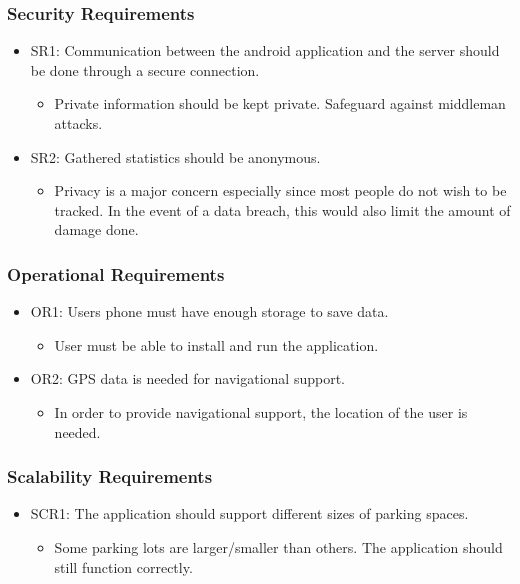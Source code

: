 \documentclass[]{article}
\begin{document}
\subsubsection{Security Requirements}
\begin{itemize}
	\item SR1: Communication between the android application and the server should be done through a secure connection.
	\begin{itemize}
		\item Private information should be kept private. Safeguard against middleman attacks.
	\end{itemize}
	
	\item SR2: Gathered statistics should be anonymous.
	\begin{itemize}
		\item Privacy is a major concern especially since most people do not wish to be tracked. In the event of a data breach, this would also limit the amount of damage done.
	\end{itemize}
		
\end{itemize}
\subsubsection{Operational Requirements}
\begin{itemize}
	\item OR1: Users phone must have enough storage to save data.
	\begin{itemize}
		\item User must be able to install and run the application.
	\end{itemize}
	
	\item OR2: GPS data is needed for navigational support.
	\begin{itemize}
		\item In order to provide navigational support, the location of the user is needed.
	\end{itemize}
	
\end{itemize}

\subsubsection{Scalability Requirements}
\begin{itemize}
	\item SCR1: The application should support different sizes of parking spaces.
	\begin{itemize}
		\item Some parking lots are larger/smaller than others. The application should still function correctly.
	\end{itemize}
\end{itemize}
\end{document}
